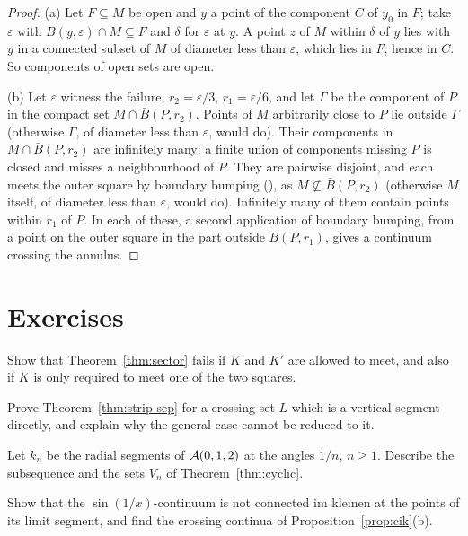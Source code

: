 \begin{proof}
(a) Let $F\subseteq M$ be open and $y$ a point of the component $C$ of $y_0$ in $F$; take $\varepsilon$ with $B(y,\varepsilon)\cap M\subseteq F$ and $\delta$ for $\varepsilon$ at $y$. A point $z$ of $M$ within $\delta$ of $y$
lies with $y$ in a connected subset of $M$ of diameter less than $\varepsilon$, which lies in $F$, hence in $C$. So components of open sets are open.

(b) Let $\varepsilon$ witness the failure, $r_2=\varepsilon/3$, $r_1=\varepsilon/6$, and let $\Gamma$ be the component of $P$ in the compact set $M\cap\bar B(P,r_2)$. Points of $M$ arbitrarily close to $P$ lie
outside $\Gamma$ (otherwise $\Gamma$, of diameter less than $\varepsilon$, would do). Their components in $M\cap\bar B(P,r_2)$ are infinitely many: a finite union of components missing $P$ is closed
and misses a neighbourhood of $P$. They are pairwise disjoint, and each meets the outer square by boundary bumping (), as $M\not\subseteq\bar B(P,r_2)$ (otherwise $M$ itself, of diameter less than $\varepsilon$, would do). Infinitely many of them
contain points within $r_1$ of $P$. In each of these, a second application of boundary bumping, from a point on the outer square in the part outside $B(P,r_1)$, gives a continuum crossing the
annulus.
\end{proof}


\section*{Exercises}

\begin{exercise}
Show that Theorem~\ref{thm:sector} fails if $K$ and $K'$ are allowed to meet, and also if $K$ is only required to meet one of the two squares.
\end{exercise}

\begin{exercise}
Prove Theorem~\ref{thm:strip-sep} for a crossing set $L$ which is a vertical segment directly, and explain why the general case cannot be reduced to it.
\end{exercise}

\begin{exercise}
Let $k_n$ be the radial segments of $\mathcal{A}(0,1,2)$ at the angles $1/n$, $n\ge1$. Describe the subsequence and the sets $V_n$ of Theorem~\ref{thm:cyclic}.
\end{exercise}

\begin{exercise}
Show that the $\sin(1/x)$-continuum is not connected im kleinen at the points of its limit segment, and find the crossing continua of Proposition~\ref{prop:cik}(b).
\end{exercise}
